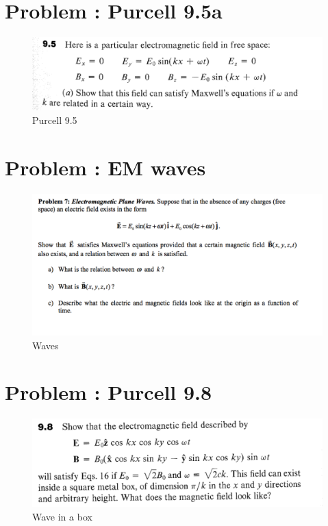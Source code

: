 \documentclass[problems]{esg8022pset}
\begin{document}
\section{Problem \thesection: Purcell 9.5a}
 \begin{figure}[H]
    \centering
    \includegraphics[width = 15cm]{pu905}
    \caption{Purcell 9.5}
  \end{figure}
\section{Problem \thesection: EM waves}
\begin{figure}[H]
    \centering
    \includegraphics[width = 15cm]{waves2}
   \caption{Waves}
  \end{figure}
\section{Problem \thesection: Purcell 9.8}
\begin{figure}[H]
    \centering
    \includegraphics[width = 15cm]{pu908}
    \caption{Wave in a box}
  \end{figure}
\end{document}
